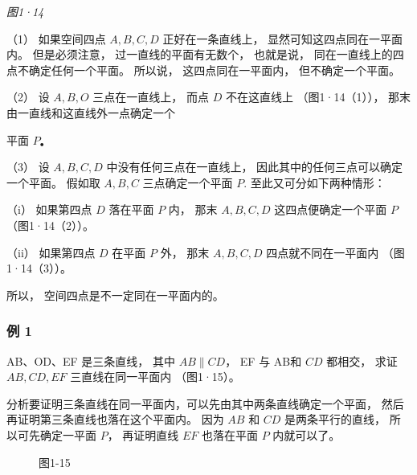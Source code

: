 \emph{图1·14}

（1） 如果空间四点 \(A, B, C, D\) 正好在一条直线上，
显然可知这四点同在一平面内。 但是必须注意， 过一直线的平面有无数个，
也就是说， 同在一直线上的四点不确定任何一个平面。 所以说，
这四点同在一平面内， 但不确定一个平面。

（2） 设 \(A, B, O\) 三点在一直线上， 而点 \(D\) 不在这直线上
（图1·14（1））， 那末由一直线和这直线外一点确定一个

平面 \(P_{\bullet}\)

（3） 设 \(A, B, C, D\) 中没有任何三点在一直线上，
因此其中的任何三点可以确定一个平面。 假如取 \(A, B, C\) 三点确定一个平面
\(P\). 至此又可分如下两种情形：

（i） 如果第四点 \(D\) 落在平面 \(P\) 内， 那末 \(A, B, C, D\)
这四点便确定一个平面 \(P\) （图1·14（2））。

（ii） 如果第四点 \(D\) 在平面 \(P\) 外， 那末 \(A, B, C, D\)
四点就不同在一平面内 （图1·14（3））。

所以， 空间四点是不一定同在一平面内的。

\subsubsection{例 1}

AB、OD、EF 是三条直线， 其中 \(AB \parallel CD\)， EF 与 AB和 \(CD\)
都相交， 求证 \(AB, CD, EF\) 三直线在同一平面内 （图1·15）。

分析要证明三条直线在同一平面内，可以先由其中两条直线确定一个平面，
然后再证明第三条直线也落在这个平面内。 因为 \(AB\) 和 \(CD\)
是两条平行的直线， 所以可先确定一平面 \(P\)， 再证明直线 \(EF\)
也落在平面 \(P\) 内就可以了。

\begin{figure}
\centering
{}
\caption{图1-15}
\end{figure}

